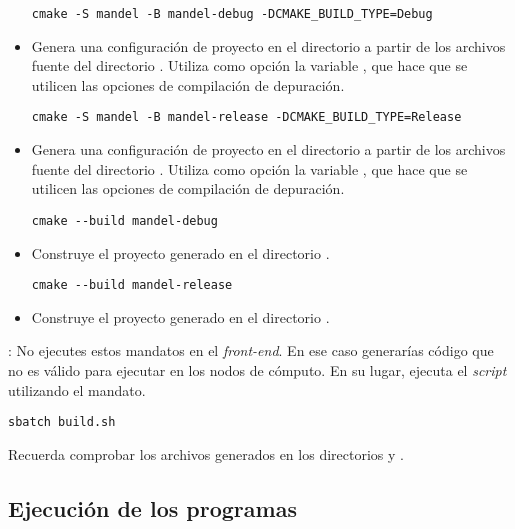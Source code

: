 \begin{itemize}
\begin{lstlisting}[style=terminal]
cmake -S mandel -B mandel-debug -DCMAKE_BUILD_TYPE=Debug
\end{lstlisting}
  \item Genera una configuración de proyecto en el directorio 
        a partir de los archivos fuente del directorio .
        Utiliza como opción la variable ,
        que hace que se utilicen las opciones de compilación de depuración.

\begin{lstlisting}[style=terminal]
cmake -S mandel -B mandel-release -DCMAKE_BUILD_TYPE=Release
\end{lstlisting}
  \item Genera una configuración de proyecto en el directorio 
        a partir de los archivos fuente del directorio .
        Utiliza como opción la variable ,
        que hace que se utilicen las opciones de compilación de depuración.

\begin{lstlisting}[style=terminal]
cmake --build mandel-debug
\end{lstlisting}
  \item Construye el proyecto generado en el directorio .

\begin{lstlisting}[style=terminal]
cmake --build mandel-release
\end{lstlisting}
  \item Construye el proyecto generado en el directorio .

\end{itemize}

: No ejecutes estos mandatos en el \emph{front-end}.
En ese caso generarías código que no es válido para ejecutar en los 
nodos de cómputo. En su lugar, ejecuta el \emph{script} utilizando el mandato.

\begin{lstlisting}[style=terminal]
sbatch build.sh
\end{lstlisting}

Recuerda comprobar los archivos generados en los directorios 
y .

\subsection{Ejecución de los programas}

